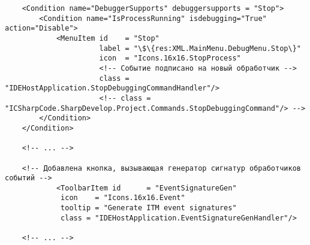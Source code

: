 \begin{lstlisting}
	<Condition name="DebuggerSupports" debuggersupports = "Stop">
		<Condition name="IsProcessRunning" isdebugging="True" action="Disable">
			<MenuItem id    = "Stop"
					  label = "\$\{res:XML.MainMenu.DebugMenu.Stop\}"
					  icon  = "Icons.16x16.StopProcess"
					  <!-- Событие подписано на новый обработчик -->
					  class = "IDEHostApplication.StopDebuggingCommandHandler"/>
					  <!-- class = "ICSharpCode.SharpDevelop.Project.Commands.StopDebuggingCommand"/> -->
		</Condition>
	</Condition>

	<!-- ... -->
	
	<!-- Добавлена кнопка, вызывающая генератор сигнатур обработчиков событий -->
			<ToolbarItem id      = "EventSignatureGen"
			 icon    = "Icons.16x16.Event"
			 tooltip = "Generate ITM event signatures"
			 class = "IDEHostApplication.EventSignatureGenHandler"/> 

	<!-- ... -->
\end{lstlisting}
